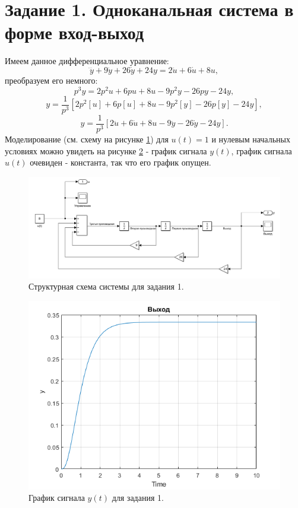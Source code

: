 \section*{Задание 1. Одноканальная система в форме вход-выход}

Имеем данное дифференциальное уравнение:
\begin{equation*}
    \dddot y + 9\ddot y + 26\dot y + 24 y = 2\ddot u +6\dot u +8 u,
\end{equation*}
преобразуем его немного:
\begin{equation*}
    p^3y=2p^2u+6pu+8u-9p^2y-26py-24y,
\end{equation*}
\begin{equation*}
    y=\frac{1}{p^3}[2p^2[u]+6p[u]+8u-9p^2[y]-26p[y]-24y],
\end{equation*}
\begin{equation*}
    y=\frac{1}{p^3}[2\ddot u+6\dot u+8u-9\ddot y-26\dot y-24y].
\end{equation*}
Моделирование (см. схему на рисунке \ref{fig:task_1_slx}) для $u(t)=1$ и 
нулевым начальных условиях можно увидеть на рисунке \ref{fig:task_1_y} - график сигнала $y(t)$,
график сигнала $u(t)$ очевиден - константа, так что его график опущен.

\begin{figure}[htbp]
    \centering
    \includegraphics[width=\linewidth]{figs/task_1_slx.png}
    \caption{Структурная схема системы для задания 1.}
    \label{fig:task_1_slx}
\end{figure}

\begin{figure}[htbp]
    \centering
    \includegraphics[width=0.7\linewidth]{figs/task_1_out.png}
    \caption{График сигнала $y(t)$ для задания 1.}
    \label{fig:task_1_y}
\end{figure}




